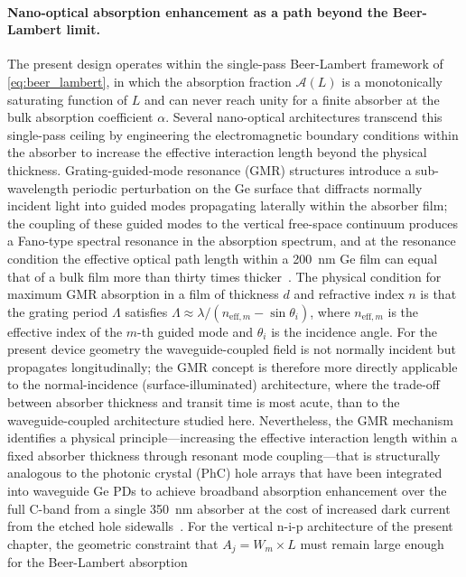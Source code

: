 \paragraph{Nano-optical absorption enhancement as a path beyond the Beer-Lambert
limit.}
The present design operates within the single-pass Beer-Lambert framework of
\cref{eq:beer_lambert}, in which the absorption fraction $\mathcal{A}(L)$
is a monotonically saturating function of $L$ and can never reach unity for
a finite absorber at the bulk absorption coefficient $\alpha$. Several
nano-optical architectures transcend this single-pass ceiling by engineering
the electromagnetic boundary conditions within the absorber to increase the
effective interaction length beyond the physical thickness. Grating-guided-mode
resonance (GMR) structures introduce a sub-wavelength periodic perturbation
on the Ge surface that diffracts normally incident light into guided modes
propagating laterally within the absorber film; the coupling of these guided
modes to the vertical free-space continuum produces a Fano-type spectral
resonance in the absorption spectrum, and at the resonance condition the
effective optical path length within a \SI{200}{\nano\metre} Ge film can equal
that of a bulk film more than thirty times thicker~\cite{Yan2024}. The physical
condition for maximum GMR absorption in a film of thickness $d$ and refractive
index $n$ is that the grating period $\Lambda$ satisfies
$\Lambda \approx \lambda/(n_{\mathrm{eff},m} - \sin\theta_i)$, where
$n_{\mathrm{eff},m}$ is the effective index of the $m$-th guided mode and
$\theta_i$ is the incidence angle. For the present device geometry the
waveguide-coupled field is not normally incident but propagates longitudinally;
the GMR concept is therefore more directly applicable to the normal-incidence
(surface-illuminated) architecture, where the trade-off between absorber
thickness and transit time is most acute, than to the waveguide-coupled
architecture studied here. Nevertheless, the GMR mechanism identifies a
physical principle—increasing the effective interaction length within a fixed
absorber thickness through resonant mode coupling—that is structurally analogous
to the photonic crystal (PhC) hole arrays that have been integrated into
waveguide Ge PDs to achieve broadband absorption enhancement over the full
C-band from a single \SI{350}{\nano\metre} absorber at the cost of increased
dark current from the etched hole sidewalls~\cite{Yan2024}. For the vertical
n-i-p architecture of the present chapter, the geometric constraint that
$A_j = W_m \times L$ must remain large enough for the Beer-Lambert absorption
